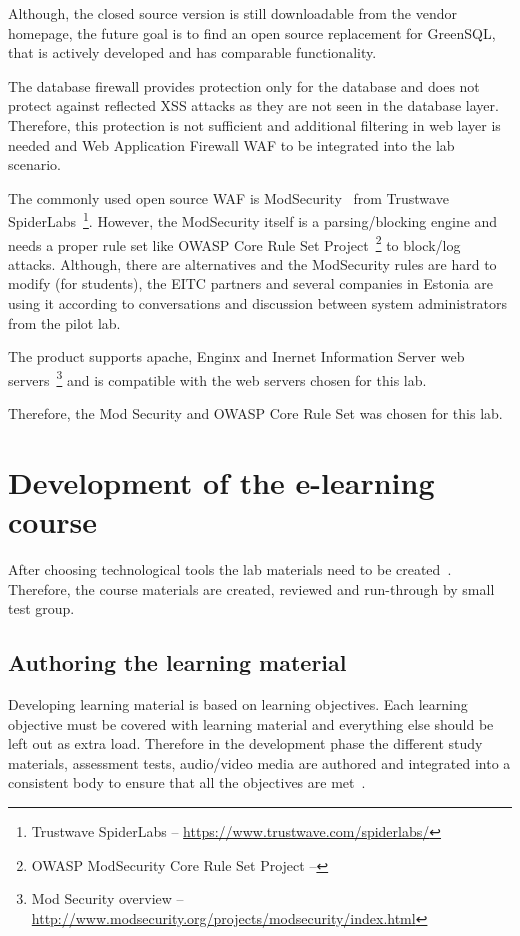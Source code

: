 Although, the closed source version is still downloadable from the vendor homepage, the future goal is to find an open source replacement for GreenSQL, that is actively developed and has comparable functionality.

The database firewall provides protection only for the database and does not protect against  reflected \gls{XSS} attacks as they are not seen in the database layer. Therefore, this protection is not sufficient and additional filtering in web layer is needed and Web Application Firewall \gls{WAF} to be integrated into the lab scenario.

The commonly used open source \gls{WAF} is ModSecurity~\citep[p.196]{book:practica_intrusion_analysis} from Trustwave SpiderLabs~\footnote{Trustwave SpiderLabs -- \url{https://www.trustwave.com/spiderlabs/}}. However, the ModSecurity itself is a parsing/blocking engine and needs a proper rule set like \gls{OWASP} Core Rule Set Project~\footnote{OWASP ModSecurity Core Rule Set Project -- } to block/log attacks. Although, there are alternatives and the ModSecurity rules are hard to modify (for students), the \gls{EITC} partners and several companies in Estonia are using it according to conversations and discussion between system administrators  from  the pilot lab.

The product supports apache, Enginx and Inernet Information Server web servers~\footnote{Mod Security overview -- \url{http://www.modsecurity.org/projects/modsecurity/index.html}} and is compatible with the web servers chosen for this lab.

Therefore, the Mod Security and \gls{OWASP} Core Rule Set was chosen for this lab.



\section{Development of the e-learning course}
After choosing technological tools the lab materials need to be created~\citep{OppeArenduskeskus2010}. Therefore, the course materials are created, reviewed and run-through by small test group.

\subsection{Authoring the learning material}
Developing learning material is based on learning objectives. Each learning objective must be covered with learning material and everything else should be left out as extra load. Therefore in the development phase the different study materials, assessment tests, audio/video media are authored and integrated into a consistent body to ensure that all the objectives are met~\citep{OppeArenduskeskus2010}.

